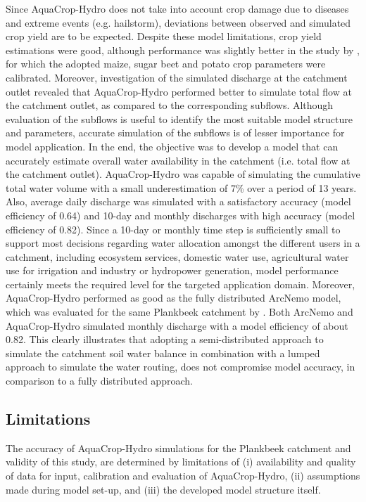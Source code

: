 Since AquaCrop-Hydro does not take into account crop damage due to diseases and extreme events (e.g. hailstorm), deviations between observed and simulated crop yield are to be expected. Despite these model limitations, crop yield estimations were good, although performance was slightly better in the study by \textcite{vanuytrecht2015}, for which the adopted maize, sugar beet and potato crop parameters were calibrated. Moreover, investigation of the simulated discharge at the catchment outlet revealed that AquaCrop-Hydro performed better to simulate total flow at the catchment outlet, as compared to the corresponding subflows. Although evaluation of the subflows is useful to identify the most suitable model structure and parameters, accurate simulation of the subflows is of lesser importance for model application. In the end, the objective was to develop a model that can accurately estimate overall water availability in the catchment (i.e. total flow at the catchment outlet). AquaCrop-Hydro was capable of simulating the cumulative total water volume with a small underestimation of 7\% over a period of 13 years. Also, average daily discharge was simulated with a satisfactory accuracy (model efficiency of 0.64) and 10-day and monthly discharges with high accuracy (model efficiency of 0.82). Since a 10-day or monthly time step is sufficiently small to support most decisions regarding water allocation amongst the different users in a catchment, including ecosystem services, domestic water use, agricultural water use for irrigation and industry or hydropower generation, model performance certainly meets the required level for the targeted application domain. Moreover, AquaCrop-Hydro performed as good as the fully distributed ArcNemo model,  which was evaluated for the same Plankbeek catchment by \textcite{vanopstal2014}. Both ArcNemo and AquaCrop-Hydro simulated monthly discharge with a model efficiency of  about 0.82. This clearly illustrates that adopting a semi-distributed approach to simulate the catchment soil water balance in combination with a lumped approach to simulate the water routing, does not compromise model accuracy, in comparison to a fully distributed approach. 

\subsection{Limitations}
The accuracy of AquaCrop-Hydro simulations for the Plankbeek catchment and validity of this study, are determined by limitations of (i) availability and quality of data for input, calibration and evaluation of AquaCrop-Hydro, (ii) assumptions made during model set-up, and (iii) the developed model structure itself. 

